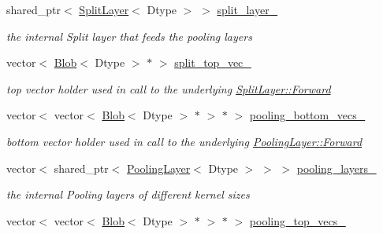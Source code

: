 \begin{DoxyCompactItemize}
\item 
shared\+\_\+ptr$<$ \hyperlink{classcaffe_1_1SplitLayer}{Split\+Layer}$<$ Dtype $>$ $>$ \hyperlink{classcaffe_1_1SPPLayer_a9312cb2eb190ce25d9269d9319cf5e4b}{split\+\_\+layer\+\_\+}\hypertarget{classcaffe_1_1SPPLayer_a9312cb2eb190ce25d9269d9319cf5e4b}{}\label{classcaffe_1_1SPPLayer_a9312cb2eb190ce25d9269d9319cf5e4b}

\begin{DoxyCompactList}\small\item\em the internal Split layer that feeds the pooling layers \end{DoxyCompactList}\item 
vector$<$ \hyperlink{classcaffe_1_1Blob}{Blob}$<$ Dtype $>$ $\ast$ $>$ \hyperlink{classcaffe_1_1SPPLayer_aa4c2a009d84367e72b98b3b8542e3a0f}{split\+\_\+top\+\_\+vec\+\_\+}\hypertarget{classcaffe_1_1SPPLayer_aa4c2a009d84367e72b98b3b8542e3a0f}{}\label{classcaffe_1_1SPPLayer_aa4c2a009d84367e72b98b3b8542e3a0f}

\begin{DoxyCompactList}\small\item\em top vector holder used in call to the underlying \hyperlink{classcaffe_1_1Layer_aa5fc9ddb31b58958653372bdaaccde94}{Split\+Layer\+::\+Forward} \end{DoxyCompactList}\item 
vector$<$ vector$<$ \hyperlink{classcaffe_1_1Blob}{Blob}$<$ Dtype $>$ $\ast$ $>$ $\ast$ $>$ \hyperlink{classcaffe_1_1SPPLayer_a2c9e8e5e918431ccc43e8578419357c9}{pooling\+\_\+bottom\+\_\+vecs\+\_\+}\hypertarget{classcaffe_1_1SPPLayer_a2c9e8e5e918431ccc43e8578419357c9}{}\label{classcaffe_1_1SPPLayer_a2c9e8e5e918431ccc43e8578419357c9}

\begin{DoxyCompactList}\small\item\em bottom vector holder used in call to the underlying \hyperlink{classcaffe_1_1Layer_aa5fc9ddb31b58958653372bdaaccde94}{Pooling\+Layer\+::\+Forward} \end{DoxyCompactList}\item 
vector$<$ shared\+\_\+ptr$<$ \hyperlink{classcaffe_1_1PoolingLayer}{Pooling\+Layer}$<$ Dtype $>$ $>$ $>$ \hyperlink{classcaffe_1_1SPPLayer_a4cde4ff418007bcbdd34f91c6abbea1f}{pooling\+\_\+layers\+\_\+}\hypertarget{classcaffe_1_1SPPLayer_a4cde4ff418007bcbdd34f91c6abbea1f}{}\label{classcaffe_1_1SPPLayer_a4cde4ff418007bcbdd34f91c6abbea1f}

\begin{DoxyCompactList}\small\item\em the internal Pooling layers of different kernel sizes \end{DoxyCompactList}\item 
vector$<$ vector$<$ \hyperlink{classcaffe_1_1Blob}{Blob}$<$ Dtype $>$ $\ast$ $>$ $\ast$ $>$ \hyperlink{classcaffe_1_1SPPLayer_a4bddcb27cbc0e9e2d153d134d5f9d760}{pooling\+\_\+top\+\_\+vecs\+\_\+}\hypertarget{classcaffe_1_1SPPLayer_a4bddcb27cbc0e9e2d153d134d5f9d760}{}\label{classcaffe_1_1SPPLayer_a4bddcb27cbc0e9e2d153d134d5f9d760}


\end{DoxyCompactItemize}
